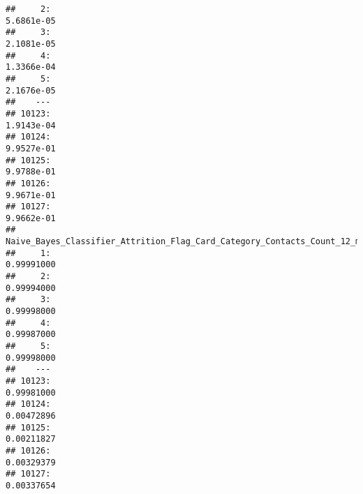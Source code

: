 \documentclass[]{article}
\begin{document}
\begin{verbatim}
##     2:                                                                                                                         5.6861e-05
##     3:                                                                                                                         2.1081e-05
##     4:                                                                                                                         1.3366e-04
##     5:                                                                                                                         2.1676e-05
##    ---                                                                                                                                   
## 10123:                                                                                                                         1.9143e-04
## 10124:                                                                                                                         9.9527e-01
## 10125:                                                                                                                         9.9788e-01
## 10126:                                                                                                                         9.9671e-01
## 10127:                                                                                                                         9.9662e-01
##        Naive_Bayes_Classifier_Attrition_Flag_Card_Category_Contacts_Count_12_mon_Dependent_count_Education_Level_Months_Inactive_12_mon_2
##     1:                                                                                                                         0.99991000
##     2:                                                                                                                         0.99994000
##     3:                                                                                                                         0.99998000
##     4:                                                                                                                         0.99987000
##     5:                                                                                                                         0.99998000
##    ---                                                                                                                                   
## 10123:                                                                                                                         0.99981000
## 10124:                                                                                                                         0.00472896
## 10125:                                                                                                                         0.00211827
## 10126:                                                                                                                         0.00329379
## 10127:                                                                                                                         0.00337654
\end{verbatim}
\end{document}
